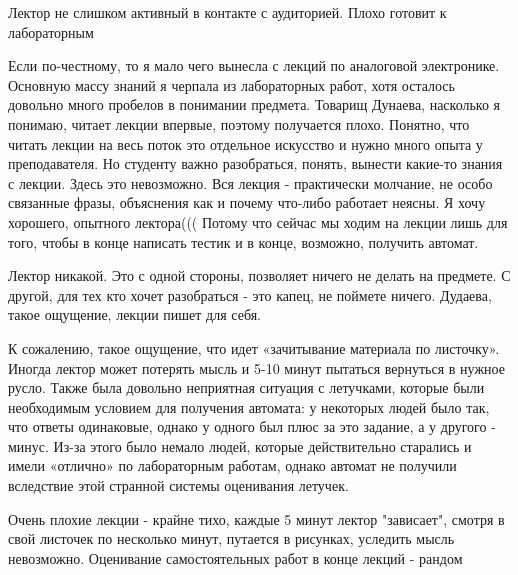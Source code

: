             \begin{commentbox} 
                Лектор не слишком активный в контакте с аудиторией. Плохо готовит к лабораторным 
            \end{commentbox} 
        
            \begin{commentbox} 
                Если по-честному, то я мало чего вынесла с лекций по аналоговой электронике. Основную массу знаний я черпала из лабораторных работ, хотя осталось довольно много пробелов в понимании предмета. Товарищ Дунаева, насколько я понимаю, читает лекции впервые, поэтому получается плохо. Понятно, что читать лекции на весь поток это отдельное искусство и нужно много опыта у преподавателя. Но студенту важно разобраться, понять, вынести какие-то знания с лекции. Здесь это невозможно. Вся лекция - практически молчание, не особо связанные фразы, объяснения как и почему что-либо работает неясны. Я хочу хорошего, опытного лектора((( Потому что сейчас мы ходим на лекции лишь для того, чтобы в конце написать тестик и в конце, возможно, получить автомат. 
            \end{commentbox} 
        
            \begin{commentbox} 
                Лектор никакой. Это с одной стороны, позволяет ничего не делать на предмете. С другой, для тех кто хочет разобраться - это капец, не поймете ничего. Дудаева, такое ощущение, лекции пишет для себя. 
            \end{commentbox} 
        
            \begin{commentbox} 
                К сожалению, такое ощущение, что идет «зачитывание материала по листочку». Иногда лектор может потерять мысль и 5-10 минут пытаться  вернуться в нужное русло. Также была довольно неприятная ситуация с летучками, которые были необходимым условием для получения автомата: у некоторых людей было так, что ответы одинаковые, однако у одного был плюс за это задание, а у другого - минус. Из-за этого было немало людей, которые действительно старались и имели «отлично» по лабораторным работам, однако автомат не получили вследствие этой странной системы оценивания летучек. 
            \end{commentbox} 
        
            \begin{commentbox} 
                Очень плохие лекции - крайне тихо, каждые 5 минут лектор "зависает", смотря в свой листочек по несколько минут, путается в рисунках, уследить мысль невозможно. Оценивание самостоятельных работ в конце лекций - рандом 
            \end{commentbox} 
        
